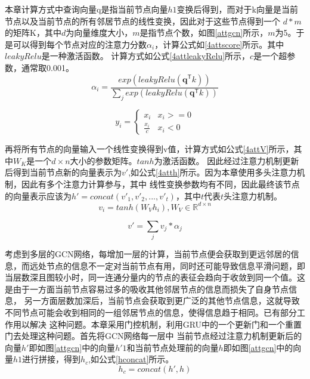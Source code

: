 本章计算方式中查询向量q是指当前节点向量$h1$变换后得到，而对于k向量是当前节点以及当前节点的所有邻居节点的线性变换，因此对于这些节点得到一个
$d*m$的矩阵K，其中$d$为向量维度大小，$m$是指节点个数，如图\ref{attgcn}所示，$m$为5。于是可以得到每个节点对应的注意力分数$\alpha_i$，计算公式如\ref{4attscore}所示。其中$leakyRelu$是一种激活函数。
计算方式如公式\ref{4attleakyRelu}所示，$c$是一个超参数，通常取0.001。
\begin{equation}\label{4attscore}
    \alpha_i = \frac{exp(leakyRelu(\mathbf{q}^\mathsf{T}k))}{\sum_{j}exp(leakyRelu(\mathbf{q}^\mathsf{T}k))}
\end{equation}

\begin{equation}\label{4attleakyRelu}
y_i =
\begin{cases}
x_i & \text{$x_i>=0$} \\
\frac{x_i}{c} & \text{$x_i<0$}
\end{cases}
\end{equation}

再将所有节点的向量输入一个线性变换得到v值，计算方式如公式\ref{4attV}所示，其中$W_K$是一个$d\times n$大小的参数矩阵。$tanh$为激活函数。
因此经过注意力机制更新后得到当前节点新的向量表示为$v'$,如公式\ref{4atth}所示。因为本章使用多头注意力机制，因此有多个注意力计算参与，其中
线性变换参数均有不同，因此最终该节点的向量表示应该为$h'= concat(v'_1,v'_2,...,v'_t)$，其中$t$代表$t$头注意力机制。
\begin{equation}\label{4attV}
    v_i = tanh(W_Vh_i), W_V\in \mathbb{R}^{d\times n}
\end{equation}

\begin{equation}\label{4atth}
    v' = \sum_{j}v_j* \alpha_j
\end{equation}

考虑到多层的GCN网络，每增加一层的计算，当前节点便会获取到更远邻居的信息，而远处节点的信息不一定对当前节点有用，同时还可能导致信息平滑问题，即
当层数深且图较小时，同一连通分量内的节点的表征会趋向于收敛到同一个值。这是由于一方面当前节点容易过多的吸收其他邻居节点的信息而损失了自身节点信息，
另一方面层数加深后，当前节点会获取到更广泛的其他节点信息，这就导致不同节点可能会收到相同的一组邻居节点的信息，使得信息趋于相同。已有部分工作用以解决
这种问题。本章采用门控机制，利用GRU中的一个更新门和一个重置门去处理这种问题。首先将GCN网络每一层中
当前节点经过注意力机制更新后的向量$h'$即如图\ref{attgcn}中的向量$h'1$和当前节点处理前的向量$h$即如图\ref{attgcn}中的向量$h1$进行拼接，得到$h_c$,如公式\ref{hconcat}所示。
\begin{equation}\label{hconcat}
    h_c = concat(h',h)
\end{equation}

